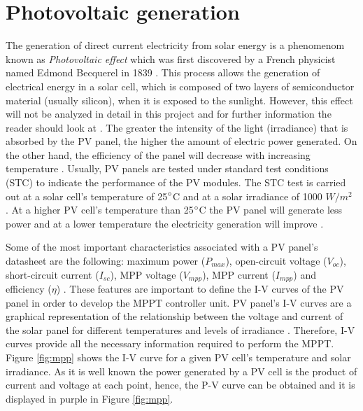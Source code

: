 \section{Photovoltaic generation}

The generation of direct current electricity from solar energy is a phenomenom known as \textit{Photovoltaic effect} which was first discovered by a French physicist named Edmond Becquerel in 1839 \cite{PVeffect}. This process allows the generation of electrical energy in a solar cell, which is composed of two layers of semiconductor material (usually silicon), when it is exposed to the sunlight. However, this effect will not be analyzed in detail in this project and for further information the reader should look at \cite{PVeffect}. The greater the intensity of the light (irradiance) that is absorbed by the PV panel, the higher the amount of electric power generated. On the other hand, the efficiency of the panel will decrease with increasing temperature \cite{handbook}. Usually, PV panels are tested under standard test conditions (STC) to indicate the performance of the PV modules. The STC test is carried out at a solar cell's temperature of 25$\dec$C and at a solar irradiance of 1000 $W/ m^2$ \cite{handbook}. At a higher PV cell's temperature than 25$\dec$C the PV panel will generate less power and at a lower temperature the electricity generation will improve \cite{handbook}. %


Some of the most important characteristics associated with a PV panel’s datasheet are the following: maximum power ($P_{max}$), open-circuit voltage ($V_{oc}$), short-circuit current ($I_{sc}$), MPP voltage ($V_{mpp}$), MPP current ($I_{mpp}$) and efficiency ($\eta$) \cite{handbook}.  %
These features are important to define the I-V curves of the PV panel in order to develop the MPPT controller unit. PV panel's I-V curves are a graphical representation of the relationship between the voltage and current of the solar panel for different temperatures and levels of irradiance \cite{IVcurves}. Therefore, I-V curves provide all the necessary information required to perform the MPPT. Figure \ref{fig:mpp} shows the I-V curve for a given PV cell's temperature and solar irradiance. As it is well known the power generated by a PV cell is the product of current and voltage at each point, hence, the P-V curve can be obtained and it is displayed in purple in Figure \ref{fig:mpp}.  %

